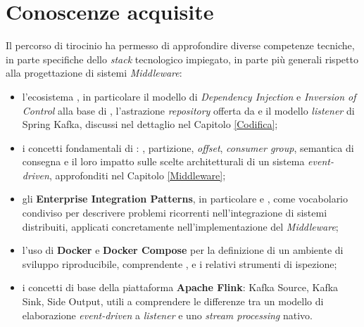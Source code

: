 \section{Conoscenze acquisite}
Il percorso di tirocinio ha permesso di approfondire diverse competenze tecniche, in parte specifiche dello \textit{stack} tecnologico impiegato, in parte più generali rispetto alla progettazione di sistemi \textit{Middleware}:
\begin{itemize}
    \item l'ecosistema \textbf{}, in particolare il modello di \textit{\gls{Dependency Injection}} e \textit{\gls{Inversion of Control}} alla base di , l'astrazione \textit{repository} offerta da  e il modello \textit{listener} di Spring Kafka, discussi nel dettaglio nel Capitolo \ref{Codifica};
    \item i concetti fondamentali di \textbf{}: \textit{}, partizione, \textit{offset}, \textit{consumer group}, semantica di consegna e il loro impatto sulle scelte architetturali di un sistema \textit{event-driven}, approfonditi nel Capitolo \ref{Middleware};
    \item gli \textbf{Enterprise Integration Patterns}, in particolare  e , come vocabolario condiviso per descrivere problemi ricorrenti nell'integrazione di sistemi distribuiti, applicati concretamente nell'implementazione del \textit{Middleware};
    \item l'uso di \textbf{Docker} e \textbf{Docker Compose} per la definizione di un ambiente di sviluppo riproducibile, comprendente ,  e i relativi strumenti di ispezione;
    \item i concetti di base della piattaforma \textbf{Apache Flink}: \gls{Kafka Source}, \gls{Kafka Sink}, \gls{Side Output}, utili a comprendere le differenze tra un modello di elaborazione \textit{event-driven} a \textit{listener} e uno \textit{stream processing} nativo.
\end{itemize}

\newpage
